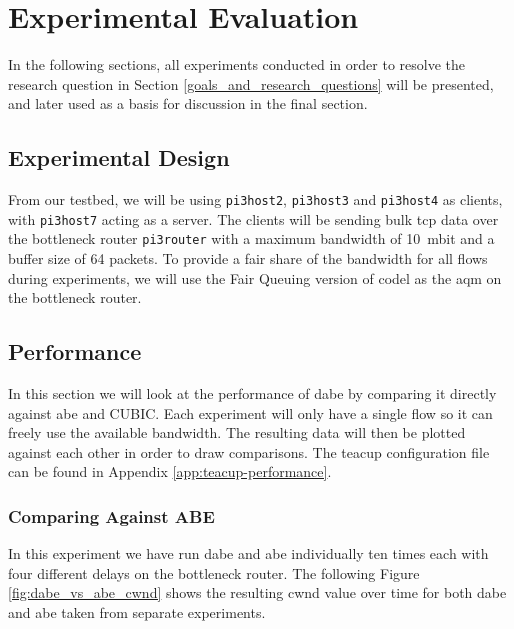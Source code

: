 \chapter{Experimental Evaluation} \label{ch:experimental_evaluation}

In the following sections, all experiments conducted in order to resolve the research question in Section \ref{goals_and_research_questions} will be presented, and later used as a basis for discussion in the final section.









\section{Experimental Design}

From our testbed, we will be using \lstinline{pi3host2}, \lstinline{pi3host3} and \lstinline{pi3host4} as clients, with \lstinline{pi3host7} acting as a server. The clients will be sending bulk \gls{tcp} data over the bottleneck router \lstinline{pi3router} with a maximum bandwidth of \SI{10}{mbit} and a buffer size of 64 packets. To provide a fair share of the bandwidth for all flows during experiments, we will use the Fair Queuing version of \gls{codel} as the \gls{aqm} on the bottleneck router.









\section{Performance} \label{sec:performance}

In this section we will look at the performance of \gls{dabe} by comparing it directly against \gls{abe} and CUBIC. Each experiment will only have a single flow so it can freely use the available bandwidth. The resulting data will then be plotted against each other in order to draw comparisons. The \gls{teacup} configuration file can be found in Appendix \ref{app:teacup-performance}.


\subsection{Comparing Against ABE}

In this experiment we have run \gls{dabe} and \gls{abe} individually ten times each with four different delays on the bottleneck router. The following Figure \ref{fig:dabe_vs_abe_cwnd} shows the resulting \gls{cwnd} value over time for both \gls{dabe} and \gls{abe} taken from separate experiments.

